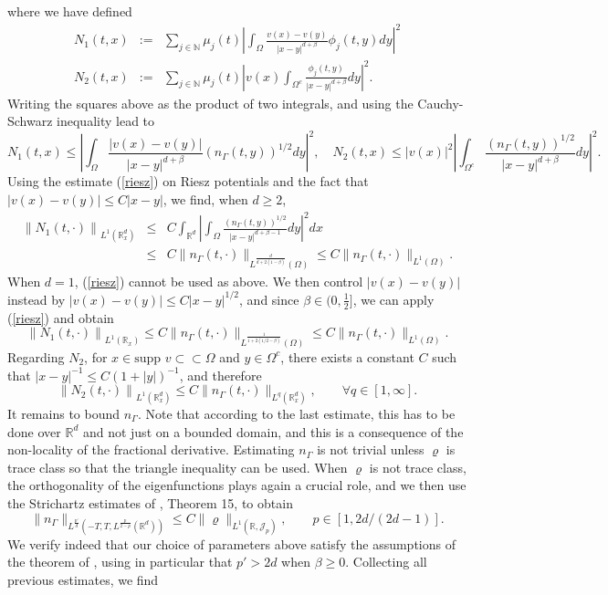 \documentclass[12pt]{article}
\def \Rm {\mathbb R}
\def \Nm {\mathbb N}
\newcommand{\calJ}{\mathcal J}
\def\fref#1{{\rm (\ref{#1})}}
\newcommand{\bee}{\begin{eqnarray*}}
\newcommand{\eee}{\end{eqnarray*}}
\begin{document}
where we have defined
\bee
N_1(t,x)&:=&\sum_{j\in \Nm} \mu_j(t)\left|\int_{\Omega} \frac{v(x)-v(y)}{|x-y|^{d+\beta}}\phi_j(t,y) dy \right|^2\\
 N_2(t,x)&:=& \sum_{j\in \Nm} \mu_j(t)\left|v(x)\int_{\Omega^c} \frac{\phi_j(t,y)}{|x-y|^{d+\beta}} dy \right|^2.
\eee
Writing the squares above as the product of two integrals, and using the Cauchy-Schwarz inequality lead to
$$
N_1(t,x) \leq \left|\int_{\Omega} \frac{|v(x)-v(y)|}{|x-y|^{d+\beta}} (n_{\Gamma}(t,y))^{1/2} dy \right|^2, \quad N_2(t,x) \leq |v(x)|^2 \left|\int_{\Omega^c} \frac{(n_{\Gamma}(t,y))^{1/2} }{|x-y|^{d+\beta}} dy \right|^2.
$$
Using the estimate \fref{riesz} on Riesz potentials and the fact that $|v(x)-v(y)|\leq C |x-y|$, we find, when $d\geq 2$,
\bee
\left\| N_1(t,\cdot) \right\|_{L^1(\Rm^d_x)} &\leq& C \int_{\Rm^d} \left|\int_{\Omega} \frac{(n_{\Gamma}(t,y))^{1/2} }{|x-y|^{d+\beta-1}} dy \right|^2 dx\\[2mm]
& \leq &C \|n_{\Gamma}(t,\cdot)\|_{L^{\frac{d}{d+2(1-\beta)}}(\Omega)} \leq C  \|n_{\Gamma}(t,\cdot)\|_{L^{1}(\Omega)}.
\eee
When $d=1$, \fref{riesz} cannot be used as above. We then control $|v(x)-v(y)|$ instead by $|v(x)-v(y)|\leq C |x-y|^{1/2}$, and since $\beta \in (0,\frac{1}{2}]$, we can apply \fref{riesz} and obtain
$$
\left\| N_1(t,\cdot) \right\|_{L^1(\Rm_x)} \leq C \|n_{\Gamma}(t,\cdot)\|_{L^{\frac{1}{1+2(1/2-\beta)}}(\Omega)} \leq C  \|n_{\Gamma}(t,\cdot)\|_{L^{1}(\Omega)}.
$$
Regarding $N_2$, for $x \in \textrm{supp } v \subset \subset \Omega$ and $y \in \Omega^c$, there exists a constant $C$ such that $|x-y|^{-1} \leq C (1+|y|)^{-1}$, and therefore
$$
\left\| N_2(t,\cdot) \right\|_{L^1(\Rm^d_x)} \leq C \|n_{\Gamma}(t,\cdot)\|_{L^{q}(\Rm^d_x)}, \qquad \forall q\in[1,\infty].
$$
It remains to bound $n_{\Gamma}$. Note that according to the last estimate, this has to be done over $\Rm^d$ and not just on a bounded domain, and this is a consequence of the non-locality of the fractional derivative. Estimating $n_{\Gamma}$ is not trivial unless $\varrho$ is trace class so that the triangle inequality can be used. When $\varrho$ is not trace class, the orthogonality of the eigenfunctions plays again a crucial role, and we then use the Strichartz estimates of \cite{FrankSabin}, Theorem 15, to obtain 
$$
\|n_{\Gamma} \|_{L^{\frac{p'}{d}}(-T,T,L^{\frac{p}{2-p}}(\Rm^d))} \leq C \|\varrho \|_{L^1(\Rm,\calJ_p)}, \qquad p \in [1,2d/(2d-1)].
$$
We verify indeed that our choice of parameters above satisfy the assumptions of the theorem of \cite{FrankSabin}, using in particular that $p'>2d$ when $\beta \geq 0$. Collecting all previous estimates, we find
\end{document}
